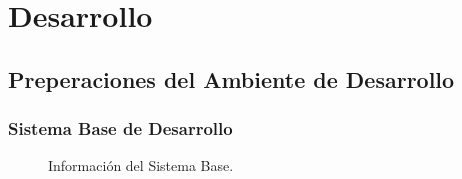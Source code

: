 
\chapter{Desarrollo}
\label{capitulo4}

\section{Preperaciones del Ambiente de Desarrollo}

\subsection{Sistema Base de Desarrollo}

\begin{figure}
	\begin{center}
    \end{center}
  	\caption{Información del Sistema Base.}
    \label{sistema-base}
\end{figure}

